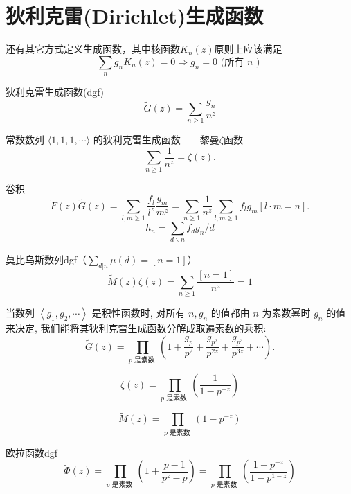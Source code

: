 \section{狄利克雷(Dirichlet)生成函数}

还有其它方式定义生成函数，其中核函数$K_n(z)$原则上应该满足
$$
\sum_{n} g_{n} K_{n}(z)=0 \Rightarrow g_{n}=0 \text { (所有 } n \text { ) }
$$

狄利克雷生成函数(dgf)
\begin{equation}
    \tilde{G}(z)=\sum_{n \geqslant 1} \frac{g_{n}}{n^{z}}
\end{equation}

常数数列 $\langle 1,1,1, \cdots\rangle$ 的狄利克雷生成函数——黎曼$\zeta$函数
\begin{equation}
    \sum_{n \geq 1} \frac{1}{n^{z}}=\zeta(z) .
\end{equation}

卷积
$$
\tilde{F}(z) \tilde{G}(z)=\sum_{l, m \geqslant 1} \frac{f_{l}}{l^{z}} \frac{g_{m}}{m^{z}}=\sum_{n \geqslant 1} \frac{1}{n^{z}} \sum_{l, m \geqslant 1} f_{l} g_{m}[l \cdot m=n] .
$$
\begin{equation}
    h_{n}=\sum_{d \backslash n} f_{d} g_{n} / d
\end{equation}

莫比乌斯数列dgf（$\sum_{d|n} \mu(d) = [n=1]$）
\begin{equation}
    \tilde{M}(z) \zeta(z)=\sum_{n \geqslant 1} \frac{[n=1]}{n^{z}}=1
\end{equation}

当数列 $\left\langle g_{1}, g_{2}, \cdots\right\rangle$ 是积性函数时, 对所有 $n, g_{n}$ 的值都由 $n$ 为素数幂时 $g_{n}$ 的值来决定, 我们能将其狄利克雷生成函数分解成取遍素数的乘积:
\begin{equation}
\tilde{G}(z)=\prod_{p \text { 是絭数 }}\left(1+\frac{g_{p}}{p^{2}}+\frac{g_{p^{2}}}{p^{2 z}}+\frac{g_{p^{3}}}{p^{3 z}}+\cdots\right) .
\end{equation}

\begin{equation}
    \zeta(z)=\prod_{p \text { 是素数 }}\left(\frac{1}{1-p^{-z}}\right)
\end{equation}

\begin{equation}
    \tilde{M}(z)=\prod_{p \text { 是素数 }}\left(1-p^{-z}\right)
\end{equation}

欧拉函数dgf
\begin{equation}
    \tilde{\Phi}(z)=\prod_{p \text { 是素数 }}\left(1+\frac{p-1}{p^{z}-p}\right)=\prod_{p \text { 是素数 }}\left(\frac{1-p^{-z}}{1-p^{1-z}}\right)
\end{equation}
